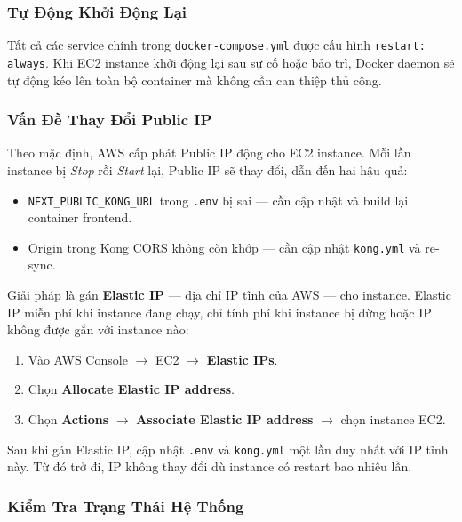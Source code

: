 \subsubsection{Tự Động Khởi Động Lại}

Tất cả các service chính trong \texttt{docker-compose.yml} được cấu hình
\texttt{restart: always}. Khi EC2 instance khởi động lại sau sự cố hoặc
bảo trì, Docker daemon sẽ tự động kéo lên toàn bộ container mà không cần
can thiệp thủ công.

\subsubsection{Vấn Đề Thay Đổi Public IP}

Theo mặc định, AWS cấp phát Public IP động cho EC2 instance. Mỗi lần
instance bị \textit{Stop} rồi \textit{Start} lại, Public IP sẽ thay đổi,
dẫn đến hai hậu quả:

\begin{itemize}
    \item \texttt{NEXT\_PUBLIC\_KONG\_URL} trong \texttt{.env} bị sai —
    cần cập nhật và build lại container frontend.
    \item Origin trong Kong CORS không còn khớp — cần cập nhật
    \texttt{kong.yml} và re-sync.
\end{itemize}

Giải pháp là gán \textbf{Elastic IP} — địa chỉ IP tĩnh của AWS — cho
instance. Elastic IP miễn phí khi instance đang chạy, chỉ tính phí khi
instance bị dừng hoặc IP không được gắn với instance nào:

\begin{enumerate}
    \item Vào AWS Console $\to$ EC2 $\to$ \textbf{Elastic IPs}.
    \item Chọn \textbf{Allocate Elastic IP address}.
    \item Chọn \textbf{Actions} $\to$ \textbf{Associate Elastic IP address}
    $\to$ chọn instance EC2.
\end{enumerate}

Sau khi gán Elastic IP, cập nhật \texttt{.env} và \texttt{kong.yml} một
lần duy nhất với IP tĩnh này. Từ đó trở đi, IP không thay đổi dù instance
có restart bao nhiêu lần.

\subsubsection{Kiểm Tra Trạng Thái Hệ Thống}

